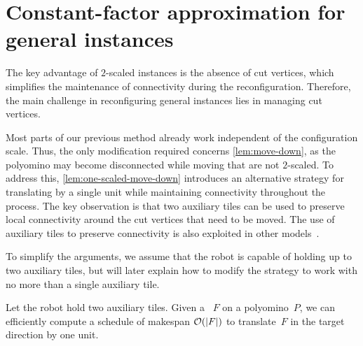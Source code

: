 \section{Constant-factor approximation for general instances}\label{sec:bounded-stretch}

The key advantage of $2$-scaled instances is the absence of cut vertices, which simplifies the maintenance of connectivity during the reconfiguration.
Therefore, the main challenge in reconfiguring general instances lies in managing cut vertices.

Most parts of our previous method already work independent of the configuration scale.
Thus, the only modification required concerns \cref{lem:move-down}, as the polyomino may become disconnected while moving \comps{} that are not $2$-scaled.
To address this, \cref{lem:one-scaled-move-down} introduces an alternative strategy for translating \comps{} by a single unit while maintaining connectivity throughout the process.
The key observation is that two auxiliary tiles can be used to preserve local connectivity around the cut vertices that need to be moved.
The use of auxiliary tiles to preserve connectivity is also exploited in other models~\cite{akitaya2021universal,michail2019transformation}.

To simplify the arguments, we assume that the robot is capable of holding up to two auxiliary tiles, but will later explain how to modify the strategy to work with no more than a single auxiliary tile.

\begin{lemma}
	\label{lem:one-scaled-move-down}
    Let the robot hold two auxiliary tiles.
    Given a \comp{}~$F$ on a polyomino~$P$,
	we can efficiently compute a schedule of makespan $\mathcal{O}(|F|)$ to translate~$F$ in the target direction by one unit.
\end{lemma}

